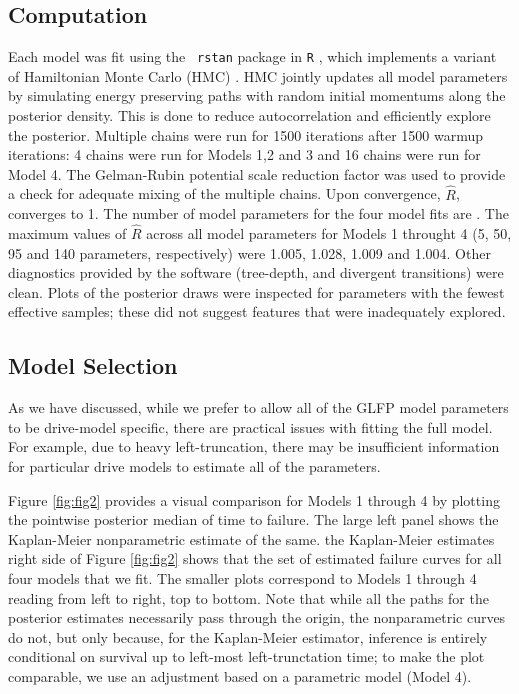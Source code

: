 \documentclass[12pt]{article}
\begin{document}
\subsection{Computation}
\label{sec:Computation}
Each model was fit using the {\tt
  rstan}\cite{rstan} package in {\tt R} \cite{r}, which implements a variant of Hamiltonian Monte Carlo (HMC)
\cite{betancourt}. HMC jointly updates all model parameters by simulating energy preserving paths with random initial momentums along the posterior density. This is done to reduce autocorrelation and efficiently explore the posterior. Multiple chains were run for 1500 iterations after 1500 warmup iterations: 4 chains were run for Models 1,2 and 3 and 16 chains were run for Model 4. The Gelman-Rubin potential scale reduction factor was used to provide a check for adequate mixing of the multiple chains. Upon convergence, $\hat{R}$, converges to 1. The number of model parameters for the four model fits are . The  maximum values of $\hat{R}$ across all model parameters for Models 1 throught 4 (5, 50, 95 and 140 parameters, respectively) were 1.005, 1.028, 1.009 and 1.004. Other diagnostics provided by the software (tree-depth, and divergent transitions) were clean. Plots of the posterior draws were inspected for parameters with the fewest effective samples; these did not suggest features that were inadequately explored.




\subsection{Model Selection}
\label{sec:Model Comparisons}
As we have discussed, while we prefer to allow all of the GLFP model parameters to be drive-model specific, there are practical issues with fitting the full model. For example, due to heavy left-truncation, there may be insufficient information for particular drive models to estimate all of the parameters. 

Figure \ref{fig:fig2} provides a visual comparison for Models 1 through 4 by plotting the pointwise posterior median of time to failure. The large left panel shows the Kaplan-Meier nonparametric estimate of the same. the Kaplan-Meier estimates right side of Figure \ref{fig:fig2} shows that the set of estimated failure curves for all four models that we fit. The smaller plots correspond to Models 1 through 4 reading from left to right, top to bottom. Note that while all the paths for the posterior estimates necessarily pass through the origin, the nonparametric curves do not, but only because, for the Kaplan-Meier estimator, inference is entirely conditional on survival up to left-most left-trunctation time; to make the plot comparable, we use an adjustment based on a parametric model (Model 4).
\end{document}
